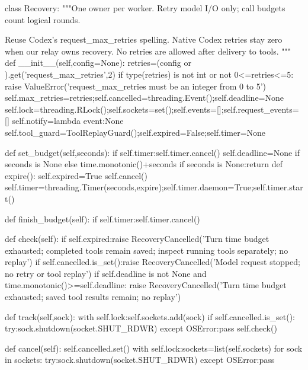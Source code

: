 class Recovery:
    """One owner per worker. Retry model I/O only; call budgets count logical rounds.

    Reuse Codex's request_max_retries spelling. Native Codex retries stay zero
    when our relay owns recovery. No retries are allowed after delivery to tools.
    """
    def __init__(self,config=None):
        retries=(config or {}).get('request_max_retries',2)
        if type(retries) is not int or not 0<=retries<=5:
            raise ValueError('request_max_retries must be an integer from 0 to 5')
        self.max_retries=retries;self.cancelled=threading.Event();self.deadline=None
        self.lock=threading.RLock();self.sockets=set();self.events=[];self.request_events=[]
        self.notify=lambda event:None
        self.tool_guard=ToolReplayGuard();self.expired=False;self.timer=None

    def set_budget(self,seconds):
        if self.timer:self.timer.cancel()
        self.deadline=None if seconds is None else time.monotonic()+seconds
        if seconds is None:return
        def expire():
            self.expired=True
            self.cancel()
        self.timer=threading.Timer(seconds,expire);self.timer.daemon=True;self.timer.start()

    def finish_budget(self):
        if self.timer:self.timer.cancel()

    def check(self):
        if self.expired:raise RecoveryCancelled('Turn time budget exhausted; completed tools remain saved; inspect running tools separately; no replay')
        if self.cancelled.is_set():raise RecoveryCancelled('Model request stopped; no retry or tool replay')
        if self.deadline is not None and time.monotonic()>=self.deadline:
            raise RecoveryCancelled('Turn time budget exhausted; saved tool results remain; no replay')

    def track(self,sock):
        with self.lock:self.sockets.add(sock)
        if self.cancelled.is_set():
            try:sock.shutdown(socket.SHUT_RDWR)
            except OSError:pass
            self.check()

    def cancel(self):
        self.cancelled.set()
        with self.lock:sockets=list(self.sockets)
        for sock in sockets:
            try:sock.shutdown(socket.SHUT_RDWR)
            except OSError:pass

